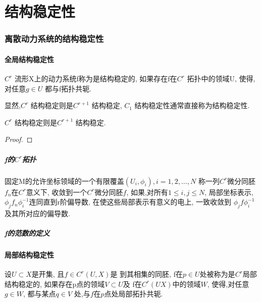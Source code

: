 \part{结构稳定性}
\section{离散动力系统的结构稳定性}

\subsection{全局结构稳定性}

\begin{definition}
    \(C^{r}\) 流形X上的动力系统f称为是结构稳定的,
    如果存在f在\(C^{r}\) 拓扑中的领域U,
    使得,对任意\(g\in U\)
    都与f拓扑共轭.
\end{definition}

显然,\(C^{r}\) 结构稳定则是\(C^{r+1}\) 结构稳定,
\(C_1\) 结构稳定性通常直接称为结构稳定性.

\begin{theorem}
    \(C^{r}\) 结构稳定则是\(C^{r+1}\) 结构稳定.
\end{theorem}
\begin{proof}
\end{proof}


\subsubsection{f的\(C^{r}\)拓扑}

固定M的允许坐标领域的一个有限覆盖\((U_i,\phi_i),i=1,2,\dots,N\)
称一列\(C^{r}\)微分同胚\(f_n\)在\(C^{r}\)意义下,
收敛到一个\(C^{r}\)微分同胚\(f\),
如果,对所有\(1\leq i,j \leq N\),
局部坐标表示,
\(\phi_j f_n \phi _i^{-1}\)连同直到r阶偏导数,
在使这些局部表示有意义的电上,
一致收敛到
\(\phi_jf\phi_i^{-1}\)
及其所对应的偏导数.

\subsubsection{f的范数的定义}


\subsection{局部结构稳定性}

\begin{definition}
    设\(U\subset X\)是开集,
    且\(f\in C^{r}(U,X)\)是
    到其相集的同胚,
    f在\(p \in U\)处被称为是\(C^{r}\)局部结构稳定的,
    如果存在p点的领域\(V\subset U\)及
    f在\(C^{r}(U X)\)中的领域\(W\),
    使得,对任意\(g\in W\),
    都与某点\(q\in V\)
    处,与\(f\)在\(p\)点处局部拓扑共轭.
\end{definition}


